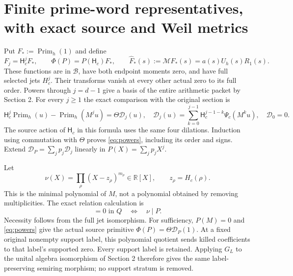 \documentclass[11pt]{article}
\newcommand{\R}{\mathbb R}
\newcommand{\B}{\mathscr B}
\newcommand{\MM}{\mathcal M}
\newcommand{\PP}{\operatorname{Prim}_h}
\newcommand{\HS}{\mathsf H_c}
\begin{document}
\section{Finite prime-word representatives, with exact source and Weil metrics}
Put $F_*:=\PP(1)$ and define
\begin{equation}
 F_j=\HS^jF_*,\qquad\Phi(P)=P(\HS)F_*,\qquad
 \widehat F_*(s):=\MM F_*(s)=a(s)U_h(s)R_1(s).
 \label{eq:word-family}
\end{equation}
These functions are in $\B$, have both endpoint moments zero, and
have full selected jets $H_c^j$. Their transforms vanish at every
other actual zero to its full order. Powers through $j=d-1$ give a
basis of the entire arithmetic packet by Section 2.
For every $j\ge1$ the exact comparison with the original section is
\begin{equation}
 \HS^j\PP(u)-\PP(M^ju)=\Theta\mathcal D_j(u),\quad
 \mathcal D_j(u)=\sum_{k=0}^{j-1}\HS^{j-1-k}\Psi_c(M^ku),
 \quad\mathcal D_0=0.\label{eq:powers}
\end{equation}
The source action of $\HS$ in this formula uses the same four
dilations. Induction using commutation with $\Theta$ proves
\eqref{eq:powers}, including its order and signs. Extend
$\mathcal D_P=\sum_jp_j\mathcal D_j$ linearly in $P(X)=\sum_jp_jX^j$.

Let
\begin{equation}
 \nu(X)=\prod_\rho(X-z_\rho)^{m_\rho}\in\R[X],
 \qquad z_\rho=H_c(\rho).
 \label{eq:nu}
\end{equation}
This is the minimal polynomial of $M$, not a polynomial obtained by
removing multiplicities. The exact relation calculation is
\begin{equation}
 [\Phi(P)]=0\text{ in }Q
 \quad\Longleftrightarrow\quad\nu\mid P.
 \label{eq:relation-ideal}
\end{equation}
Necessity follows from the full jet isomorphism. For sufficiency,
$P(M)=0$ and \eqref{eq:powers} give the actual source primitive
$\Phi(P)=\Theta\mathcal D_P(1)$.
At a fixed original nonempty support label, this polynomial quotient
sends killed coefficients to that label's supported zero. Every
support label is retained. Applying $G_L$ to the unital algebra
isomorphism of Section 2 therefore gives the same label-preserving
semiring morphism; no support stratum is removed.
\end{document}
